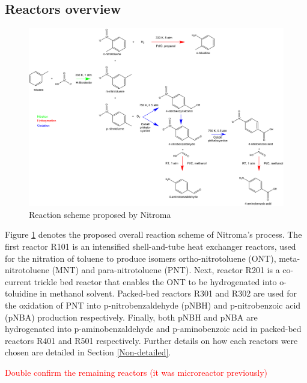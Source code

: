 \subsection{Reactors overview}
\begin{figure}[h]
    \centering
    \includegraphics[width=\linewidth]{chapters/2-reaction/figures/routes-chosen_20210220.png}
    \caption{Reaction scheme proposed by Nitroma}
    \label{fig:finalroutes}
\end{figure}
Figure \ref{fig:finalroutes} denotes the proposed overall reaction scheme of Nitroma's process. The first reactor R101 is an intensified shell-and-tube heat exchanger reactors, used for the nitration of toluene to produce isomers ortho-nitrotoluene (ONT), meta-nitrotoluene (MNT) and para-nitrotoluene (PNT). Next, reactor R201 is a co-current trickle bed reactor that enables the ONT to be hydrogenated into o-toluidine in methanol solvent. Packed-bed reactors R301 and R302 are used for the oxidation of PNT into p-nitrobenzaldehyde (pNBH) and p-nitrobenzoic acid (pNBA) production respectively. Finally, both pNBH and pNBA are hydrogenated into p-aminobenzaldehyde and p-aminobenzoic acid in packed-bed reactors R401 and R501 respectively. Further details on how each reactors were chosen are detailed in Section \ref{Non-detailed}. 

\textcolor{red}{Double confirm the remaining reactors (it was microreactor previously)} 





